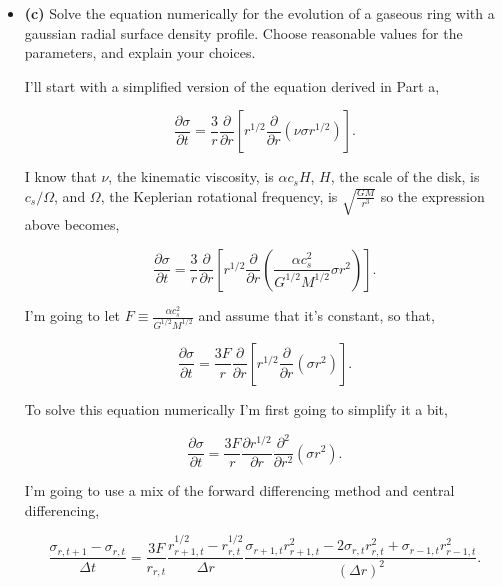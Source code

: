 \documentclass[12pt]{article}
\begin{document}
\begin{itemize}
\item \textbf{(c)} Solve the equation numerically for the evolution of a gaseous ring with a gaussian radial surface density profile. Choose reasonable values for the parameters, and explain your choices.

I'll start with a simplified version of the equation derived in Part a,

\begin{equation}
\frac{\partial \sigma}{\partial t} = \frac{3}{r}\frac{\partial}{\partial r}\left[r^{1/2}\frac{\partial}{\partial r}\left(\nu \sigma r^{1/2} \right)\right].
\end{equation}

I know that $\nu$, the kinematic viscosity, is $\alpha c_s H$, $H$, the scale of the disk, is $c_s/\Omega$, and $\Omega$, the Keplerian rotational frequency, is $\sqrt{\frac{GM}{r^3}}$ so the expression above becomes,

\begin{equation}
\frac{\partial \sigma}{\partial t} = \frac{3}{r}\frac{\partial}{\partial r}\left[r^{1/2}\frac{\partial}{\partial r}\left(\frac{\alpha c_s^2}{G^{1/2}M^{1/2}} \sigma r^2 \right)\right].
\end{equation}

I'm going to let $F \equiv \frac{\alpha c_s^2}{G^{1/2}M^{1/2}}$ and assume that it's constant, so that,

\begin{equation}
\frac{\partial \sigma}{\partial t} = \frac{3F}{r}\frac{\partial}{\partial r}\left[r^{1/2}\frac{\partial}{\partial r}\left( \sigma r^2 \right)\right].
\end{equation}

To solve this equation numerically I'm first going to simplify it a bit, 

\begin{equation}
\frac{\partial \sigma}{\partial t} = \frac{3F}{r}\frac{\partial r^{1/2}}{\partial r}\frac{\partial^2 }{\partial r^2}\left( \sigma r^2 \right).
\end{equation}

I'm going to use a mix of the forward differencing method and central differencing,

\begin{equation}
\frac{\sigma_{r, t+1} - \sigma_{r,t}}{\Delta t} = \frac{3F}{r_{r,t}}\frac{r^{1/2}_{r+1,t} - r^{1/2}_{r,t}}{\Delta r}\frac{\sigma_{r+1,t}r^2_{r+1,t} - 2\sigma_{r,t}r^2_{r,t} + \sigma_{r-1,t}r^2_{r-1,t}}{\left(\Delta r \right)^2}.
\end{equation}


\end{itemize}
\end{document}
